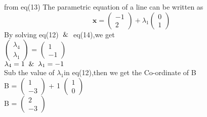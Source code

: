 \documentclass[journal,10pt,twocolumn]{article}
\newcommand{\myvec}[1]{\ensuremath{\begin{pmatrix}#1\end{pmatrix}}}
\begin{document}
\begin{flushleft}
from eq(13) The parametric equation of a line can be written as
\begin{equation}
     \boldsymbol{x} = \myvec{-1 \\ 2} + \lambda_1\myvec{0 \\ 1}
\end{equation}
By solving eq(12) $\And$ eq(14),we get
\vspace{0.3cm}\\
 \myvec{\lambda_4 \\ \lambda_1} =  \myvec{1 \\ -1}
\vspace{0.3cm}\\
$\lambda_4=1 \And \lambda_1=-1$
\vspace{0.3cm}\\
Sub the value of $\lambda_1$in eq(12),then we get the Co-ordinate of B
\vspace{0.3cm}\\
B =  \myvec{1 \\ -3} + 1  \myvec{1 \\ 0}
\vspace{0.3cm}\\
B = \myvec{2 \\ -3}

\end{flushleft}
\end{document}
